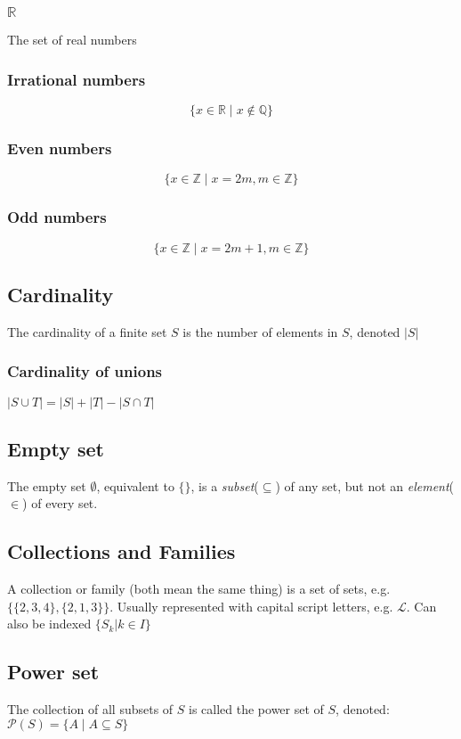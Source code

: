 \documentclass{article}
\begin{document}
\subsubsection{\(\mathbb{R}\)}
The set of real numbers
\subsubsection{Irrational numbers}
\begin{displaymath}
	\{x\in\mathbb{R}\mid x\notin\mathbb{Q}\}	
\end{displaymath}
\subsubsection{Even numbers}
\begin{displaymath}
\{x\in\mathbb{Z}\mid x=2m, m\in\mathbb{Z}\}
\end{displaymath}
\subsubsection{Odd numbers}
\begin{displaymath}
\{x\in\mathbb{Z}\mid x=2m+1, m\in\mathbb{Z}\}
\end{displaymath}
\subsection{Cardinality}
The cardinality of a finite set \(S\) is the number of elements in \(S\), denoted \(\lvert S\rvert\)
\subsubsection{Cardinality of unions}
\(\lvert S\cup T\rvert = \lvert S\rvert +\lvert T\rvert - \lvert S\cap T\rvert\)
\subsection{Empty set}
The empty set \(\emptyset\), equivalent to \(\{\}\), is a \emph{subset}(\(\subseteq\)) of any set, but not an \emph{element}(\(\in\)) of every set.
\subsection{Collections and Families}
A collection or family (both mean the same thing) is a set of sets, e.g. \(\{\{2,3,4\},\{2,1,3\}\}\). Usually represented with capital script letters, e.g. \(\mathscr{L}\). Can also be indexed \(\{S_k\lvert k\in I\}\)
\subsection{Power set}
The collection of all subsets of \(S\) is called the power set of \(S\), denoted: \(\mathscr{P}(S)=\{A\mid A\subseteq S\}\)
\end{document}
